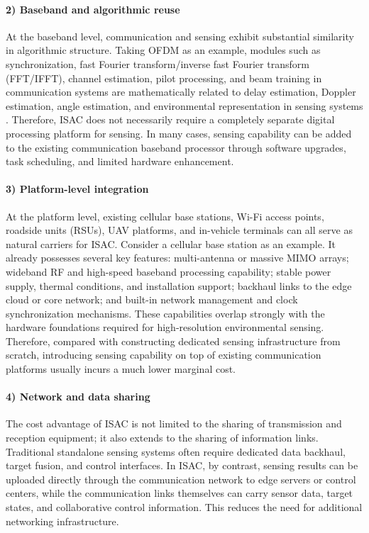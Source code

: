 \paragraph{2) Baseband and algorithmic reuse}
At the baseband level, communication and sensing exhibit substantial similarity in algorithmic structure. Taking OFDM as an example, modules such as synchronization, fast Fourier transform/inverse fast Fourier transform (FFT/IFFT), channel estimation, pilot processing, and beam training in communication systems are mathematically related to delay estimation, Doppler estimation, angle estimation, and environmental representation in sensing systems \cite{Liu2022ISAC,Sturm2011WaveformDesign}.  
Therefore, ISAC does not necessarily require a completely separate digital processing platform for sensing. In many cases, sensing capability can be added to the existing communication baseband processor through software upgrades, task scheduling, and limited hardware enhancement.

\paragraph{3) Platform-level integration}
At the platform level, existing cellular base stations, Wi-Fi access points, roadside units (RSUs), UAV platforms, and in-vehicle terminals can all serve as natural carriers for ISAC. Consider a cellular base station as an example. It already possesses several key features: multi-antenna or massive MIMO arrays; wideband RF and high-speed baseband processing capability; stable power supply, thermal conditions, and installation support; backhaul links to the edge cloud or core network; and built-in network management and clock synchronization mechanisms.  
These capabilities overlap strongly with the hardware foundations required for high-resolution environmental sensing. Therefore, compared with constructing dedicated sensing infrastructure from scratch, introducing sensing capability on top of existing communication platforms usually incurs a much lower marginal cost.

\paragraph{4) Network and data sharing}
The cost advantage of ISAC is not limited to the sharing of transmission and reception equipment; it also extends to the sharing of information links. Traditional standalone sensing systems often require dedicated data backhaul, target fusion, and control interfaces. In ISAC, by contrast, sensing results can be uploaded directly through the communication network to edge servers or control centers, while the communication links themselves can carry sensor data, target states, and collaborative control information. This reduces the need for additional networking infrastructure.

